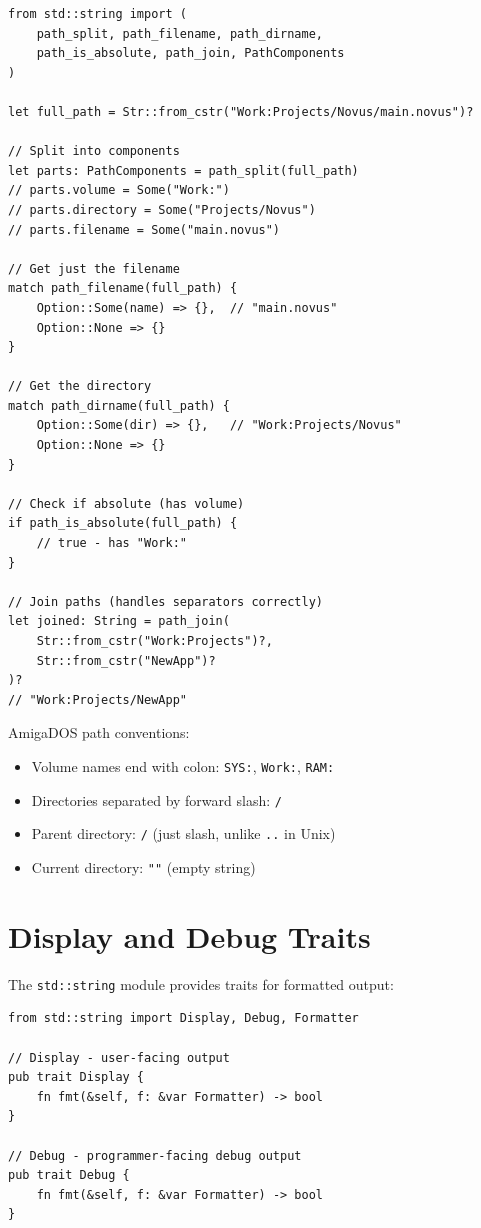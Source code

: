 \begin{lstlisting}
from std::string import (
    path_split, path_filename, path_dirname,
    path_is_absolute, path_join, PathComponents
)

let full_path = Str::from_cstr("Work:Projects/Novus/main.novus")?

// Split into components
let parts: PathComponents = path_split(full_path)
// parts.volume = Some("Work:")
// parts.directory = Some("Projects/Novus")
// parts.filename = Some("main.novus")

// Get just the filename
match path_filename(full_path) {
    Option::Some(name) => {},  // "main.novus"
    Option::None => {}
}

// Get the directory
match path_dirname(full_path) {
    Option::Some(dir) => {},   // "Work:Projects/Novus"
    Option::None => {}
}

// Check if absolute (has volume)
if path_is_absolute(full_path) {
    // true - has "Work:"
}

// Join paths (handles separators correctly)
let joined: String = path_join(
    Str::from_cstr("Work:Projects")?,
    Str::from_cstr("NewApp")?
)?
// "Work:Projects/NewApp"
\end{lstlisting}

\begin{tipbox}
AmigaDOS path conventions:
\begin{itemize}
    \item Volume names end with colon: \texttt{SYS:}, \texttt{Work:}, \texttt{RAM:}
    \item Directories separated by forward slash: \texttt{/}
    \item Parent directory: \texttt{/} (just slash, unlike \texttt{..} in Unix)
    \item Current directory: \texttt{""} (empty string)
\end{itemize}
\end{tipbox}

\section{Display and Debug Traits}
\label{sec:display-debug}

The \texttt{std::string} module provides traits for formatted output:

\begin{lstlisting}
from std::string import Display, Debug, Formatter

// Display - user-facing output
pub trait Display {
    fn fmt(&self, f: &var Formatter) -> bool
}

// Debug - programmer-facing debug output
pub trait Debug {
    fn fmt(&self, f: &var Formatter) -> bool
}
\end{lstlisting}

